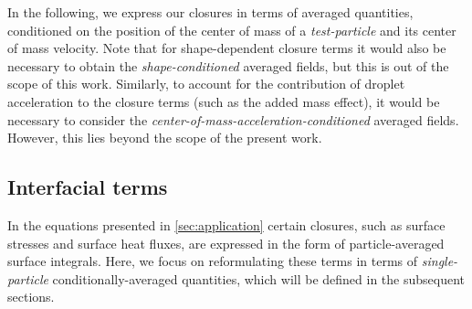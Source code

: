 In the following, we express our closures in terms of averaged quantities, conditioned on the position of the center of mass of a \textit{test-particle} and its center of mass velocity. 
Note that for shape-dependent closure terms it would also be necessary to obtain the \textit{shape-conditioned} averaged fields, but this is out of the scope of this work.
Similarly, to account for the contribution of droplet acceleration to the closure terms (such as the added mass effect), it would be necessary to consider the \textit{center-of-mass-acceleration-conditioned} averaged fields.
However, this lies beyond the scope of the present work.
  
\subsection{Interfacial terms}

In the equations presented in \ref{sec:application} certain closures, such as surface stresses and surface heat fluxes, are expressed in the form of particle-averaged surface integrals. 
Here, we focus on reformulating these terms in terms of \textit{single-particle} conditionally-averaged quantities, which will be defined in the subsequent sections.

